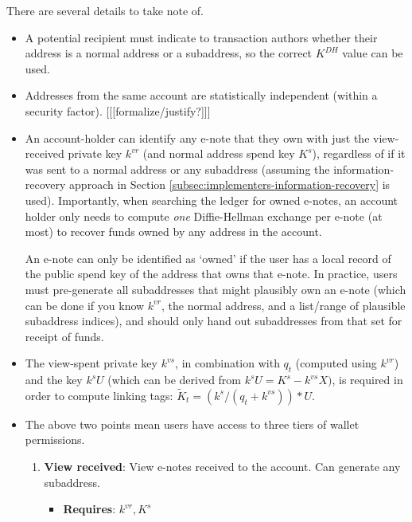There are several details to take note of.

\begin{itemize}
    \item A potential recipient must indicate to transaction authors whether their address is a normal address or a subaddress, so the correct $K^{DH}$ value can be used.

    \item Addresses from the same account are statistically independent (within a security factor). [[[formalize/justify?]]]

    \item An account-holder can identify any e-note that they own with just the view-received private key $k^{vr}$ (and normal address spend key $K^s$), regardless of if it was sent to a normal address or any subaddress (assuming the information-recovery approach in Section \ref{subsec:implementers-information-recovery} is used). Importantly, when searching the ledger for owned e-notes, an account holder only needs to compute {\em one} Diffie-Hellman exchange per e-note (at most) to recover funds owned by any address in the account.

    An e-note can only be identified as `owned' if the user has a local record of the public spend key of the address that owns that e-note. In practice, users must pre-generate all subaddresses that might plausibly own an e-note (which can be done if you know $k^{vr}$, the normal address, and a list/range of plausible subaddress indices), and should only hand out subaddresses from that set for receipt of funds.

    \item The view-spent private key $k^{vs}$, in combination with $q_t$ (computed using $k^{vr}$) and the key $k^s U$ (which can be derived from $k^s U = K^s - k^{vs} X)$, is required in order to compute linking tags: $\tilde{K}_t = (k^s/(q_t + k^{vs}))*U$.

    \item The above two points mean users have access to three tiers of wallet permissions.

    \begin{enumerate}
        \item \textbf{View received}: View e-notes received to the account. Can generate any subaddress.
        \begin{itemize}
            \item \textbf{Requires}: $k^{vr}, K^s$
        \end{itemize}


\end{enumerate}
\end{itemize}
